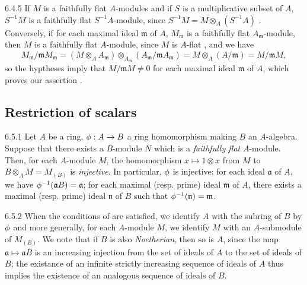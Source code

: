 \begin{env}{6.4.5}
\label{env-0.6.4.5}
If $M$ is a faithfully flat $A$-modules and if $S$ is a multiplicative subset of $A$,
$S^{-1}M$ is a faithfully flat $S^{-1}A$-module, since $S^{-1}M=M\otimes_A(S^{-1}A)$
. Conversely, if for each maximal ideal $\mathfrak{m}$ of $A$,
$M_\mathfrak{m}$ is a faithfully flat $A_\mathfrak{m}$-module, then $M$ is a faithfully flat
$A$-module, since $M$ is $A$-flat , and we have
\[
  M_\mathfrak{m}/\mathfrak{m}M_\mathfrak{m}
  =(M\otimes_A A_\mathfrak{m})
  \otimes_{A_\mathfrak{m}}(A_\mathfrak{m}/\mathfrak{m}A_\mathfrak{m})
  =M\otimes_A(A/\mathfrak{m})=M/\mathfrak{m}M,
\]
so the hyptheses imply that $M/\mathfrak{m}M\neq 0$ for each maximal ideal $\mathfrak{m}$ of
$A$, which proves our assertion .
\end{env}

\subsection{Restriction of scalars}
\label{0-prelim-6.5}

\begin{env}{6.5.1}
\label{env-0.6.5.1}
Let $A$ be a ring, $\phi:A\to B$ a ring homomorphism making $B$ an $A$-algebra. Suppose that
there exists a $B$-module $N$ which is a \emph{faithfully flat} $A$-module. Then, for each
$A$-module $M$, the homomorphism $x\mapsto 1\otimes x$ from $M$ to $B\otimes_A M=M_{(B)}$ is
\emph{injective}. In particular, $\phi$ is injective; for each ideal $\mathfrak{a}$ of $A$,
we have $\phi^{-1}(\mathfrak{a}B)=\mathfrak{a}$; for each maximal (resp. prime) ideal
$\mathfrak{m}$ of $A$, there exists a maximal (resp. prime) ideal $\mathfrak{n}$ of $B$ such
that $\phi^{-1}(\mathfrak{n})=\mathfrak{m}$.
\end{env}

\begin{env}{6.5.2}
\label{env-0.6.5.2}
When the conditions of  are satisfied, we identify $A$ with the subring of
$B$ by $\phi$ and more generally, for each $A$-module $M$, we identify $M$ with an
$A$-submodule of $M_{(B)}$. We note that if $B$ is also \emph{Noetherian}, then so is $A$,
since the map $\mathfrak{a}\mapsto\mathfrak{a}B$ is an increasing injection from the set of
ideals of $A$ to the set of ideals of $B$; the existance of an infinite strictly increasing
sequence of ideals of $A$ thus implies the existence of an analogous sequence of ideals of
$B$.
\end{env}

